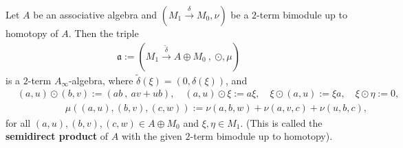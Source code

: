 \documentclass[10pt,a4paper]{amsart}
\begin{document}
\begin{thm}\label{thm-2-hom}
    Let $A$ be an associative algebra and $(M_1 \xrightarrow{\delta} M_0, \nu)$ be a $2$-term bimodule up to homotopy of $A$. Then the triple
    \begin{align*}
       \mathfrak{a} :=  ( M_1 \xrightarrow{\widetilde{\delta } } A \oplus M_0 ~ \! , ~ \! \odot, \mu )
    \end{align*}
    is a $2$-term $A_\infty$-algebra, where $\widetilde{\delta} (\xi) = (0, \delta (\xi) )$, and
    \begin{align*}
       & (a, u) \odot (b, v) := (ab ~ \! , ~ \! a v + u b), \quad (a, u) \odot \xi := a \xi, \quad \xi \odot (a, u) := \xi a, \quad \xi \odot \eta := 0,\\
       & \qquad \qquad \quad  \mu ( (a , u) , (b ,v) , (c , w ) ) := \nu (a, b, w) + \nu (a, v, c) + \nu (u, b, c),
    \end{align*}
    for all $(a, u), (b, v), (c, w) \in A \oplus M_0$ and $\xi, \eta \in M_1$. (This is called the {\bf semidirect product} of $A$ with the given $2$-term bimodule up to homotopy).
\end{thm}
\end{document}
